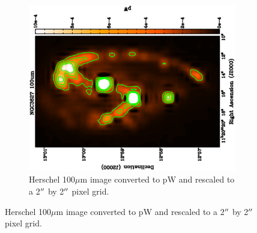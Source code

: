 \begin{figure}
\begin{subfigure}[t]{.48\textwidth}
    \includegraphics[width=1.\linewidth, angle=270]{obs_imgs/100_align.eps}
    \caption{Herschel 100$\mu$m image converted to pW and rescaled to a 2$\mbox{$^{\prime\prime}$}$ by 2$\mbox{$^{\prime\prime}$}$ pixel grid.}
  \end{subfigure}%


\end{figure}
